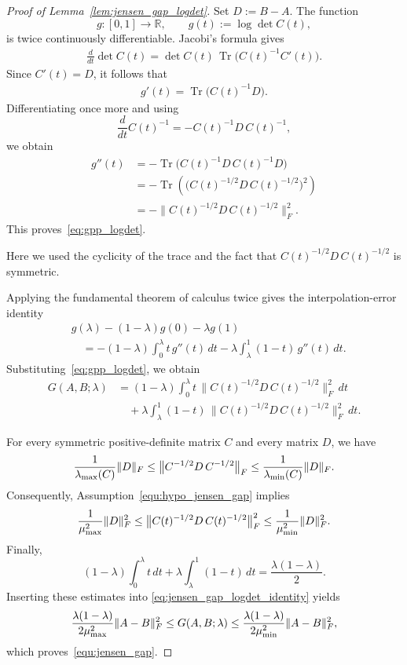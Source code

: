 \documentclass[10pt, letterpaper]{amsart}
\DeclareMathOperator{\Tr}{Tr}
\def\min{{\rm min}}
\begin{document}
\begin{proof}[Proof of Lemma~\ref{lem:jensen_gap_logdet}]
Set \(D:=B-A\). The function
\[
g:[0,1]\to\mathbb{R},
\qquad
g(t):=\log\det C(t),
\]
is twice continuously differentiable. Jacobi's formula gives
\begin{align}\label{equ:Jacobi_formula}
\frac{d}{dt}\det C(t)
=
\det C(t)\,
\Tr\!\bigl(C(t)^{-1}C'(t)\bigr).
\end{align}
Since \(C'(t)=D\), it follows that
\begin{align}\label{eq:gp_logdet}
g'(t)
=
\Tr\!\bigl(C(t)^{-1}D\bigr).
\end{align}
Differentiating once more and using
\[
\frac{d}{dt}C(t)^{-1}
=
-C(t)^{-1}D\,C(t)^{-1},
\]
we obtain
\begin{align*}
g''(t)
&=
-\Tr\!\bigl(C(t)^{-1}D\,C(t)^{-1}D\bigr) \\
&=
-\Tr\!\left(
  \bigl(C(t)^{-1/2}D\,C(t)^{-1/2}\bigr)^2
 \right) \\
&=
-\bigl\|
 C(t)^{-1/2}D\,C(t)^{-1/2}
 \bigr\|_F^2.
\end{align*}
This proves~\eqref{eq:gpp_logdet}.\par\noindent Here we used the cyclicity of the trace and the fact that
\(C(t)^{-1/2}D\,C(t)^{-1/2}\) is symmetric.

Applying the fundamental theorem of calculus twice gives the
interpolation-error identity
\begin{align}
&g(\lambda)-(1-\lambda)g(0)-\lambda g(1) \nonumber\\
&\quad=
-(1-\lambda)\int_0^\lambda t\,g''(t)\,dt
-\lambda\int_\lambda^1(1-t)\,g''(t)\,dt.
\end{align}
Substituting~\eqref{eq:gpp_logdet}, we obtain
\begin{align}
G(A,B;\lambda)
&=
(1-\lambda)\int_0^\lambda
t\,
\bigl\|
 C(t)^{-1/2}D\,C(t)^{-1/2}
\bigr\|_F^2\,dt \nonumber\\
&\quad+
\lambda\int_\lambda^1
(1-t)\,
\bigl\|
 C(t)^{-1/2}D\,C(t)^{-1/2}
\bigr\|_F^2\,dt.
\label{eq:jensen_gap_logdet_identity}
\end{align}

For every symmetric positive-definite matrix \(C\) and every matrix
\(D\), we have
\begin{align}\label{equ:frobenius_operator_norm_estimate}
\frac{1}{\lambda_{\max}(C)}
\|D\|_F
\leq
\bigl\|C^{-1/2}D\,C^{-1/2}\bigr\|_F
\leq
\frac{1}{\lambda_{\min}(C)}
\|D\|_F.
\end{align}
Consequently, Assumption~\eqref{equ:hypo_jensen_gap} implies
\[
\frac{1}{\mu_{\max}^2}\|D\|_F^2
\leq
\bigl\|C(t)^{-1/2}D\,C(t)^{-1/2}\bigr\|_F^2
\leq
\frac{1}{\mu_{\min}^2}\|D\|_F^2.
\]
Finally,
\[
(1-\lambda)\int_0^\lambda t\,dt
+
\lambda\int_\lambda^1(1-t)\,dt
=
\frac{\lambda(1-\lambda)}{2}.
\]
Inserting these estimates into
\eqref{eq:jensen_gap_logdet_identity} yields
\[
\frac{\lambda(1-\lambda)}{2\mu_{\max}^2}
\|A-B\|_F^2
\leq
G(A,B;\lambda)
\leq
\frac{\lambda(1-\lambda)}{2\mu_{\min}^2}
\|A-B\|_F^2,
\]
which proves~\eqref{equ:jensen_gap}.
\end{proof}
\end{document}
